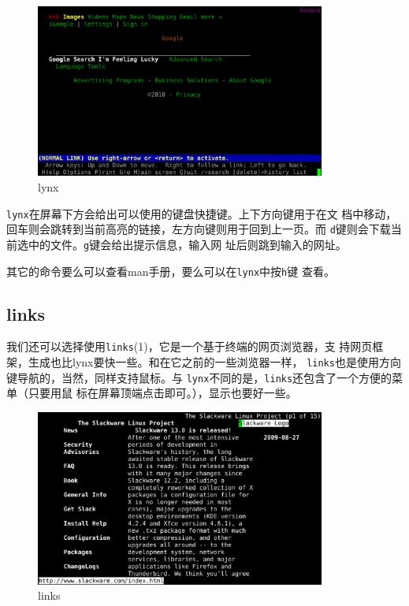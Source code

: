 \begin{figure}[htpb]
  \centering
  \includegraphics[width=0.85\textwidth]{images/basic-network-commands/lynx.eps}
  \caption{lynx}
  \label{fig:lynx}
\end{figure}
\texttt{lynx}在屏幕下方会给出可以使用的键盘快捷键。上下方向键用于在文
档中移动，回车则会跳转到当前高亮的链接，左方向键则用于回到上一页。而
\texttt{d}键则会下载当前选中的文件。\texttt{g}键会给出提示信息，输入网
址后则跳到输入的网址。

其它的命令要么可以查看man手册，要么可以在\texttt{lynx}中按\texttt{h}键
查看。

\subsection{links}
\label{chap:basicNetworkCommands:browsers:links}
我们还可以选择使用\texttt{links}(1)，它是一个基于终端的网页浏览器，支
持网页框架，生成也比lynx要快一些。和在它之前的一些浏览器一样，
\texttt{links}也是使用方向键导航的，当然，同样支持鼠标。与
\texttt{lynx}不同的是，\texttt{links}还包含了一个方便的菜单（只要用鼠
标在屏幕顶端点击即可。），显示也要好一些。
\begin{figure}[htpb]
  \centering
  \includegraphics[width=0.85\textwidth]{images/basic-network-commands/links.eps}
  \caption{links}
  \label{fig:links}
\end{figure}

